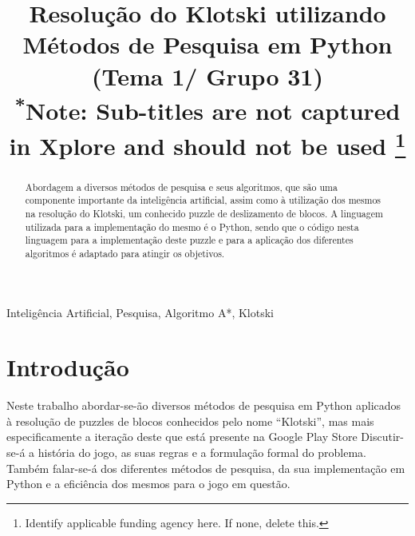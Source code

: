\documentclass[conference]{IEEEtran}
\begin{document}
\title{Resolução do Klotski utilizando Métodos de Pesquisa em Python (Tema 1/ Grupo 31)\\
{\footnotesize \textsuperscript{*}Note: Sub-titles are not captured in Xplore and
should not be used}
\thanks{Identify applicable funding agency here. If none, delete this.}
}

\author{
\and
{}
\and
{}
}

\maketitle

\begin{abstract}
Abordagem a diversos métodos de pesquisa e seus algoritmos, que são uma componente importante da inteligência artificial, assim como à utilização dos mesmos na resolução do Klotski, um conhecido puzzle de deslizamento de blocos.
A linguagem utilizada para a implementação do mesmo é o Python, sendo que o código nesta linguagem para a implementação deste puzzle e para a aplicação dos diferentes algoritmos é adaptado para atingir os objetivos.
\end{abstract}

\begin{IEEEkeywords}
Inteligência Artificial, Pesquisa, Algoritmo A*, Klotski
\end{IEEEkeywords}

\section{Introdução}
Neste trabalho abordar-se-ão diversos métodos de pesquisa em Python aplicados à resolução de puzzles de blocos conhecidos pelo nome “Klotski”, mas mais especificamente a iteração deste que está presente na Google Play Store \cite{b1} Discutir-se-á a história do jogo, as suas regras e a formulação formal do problema. Também falar-se-á dos diferentes métodos de pesquisa, da sua implementação em Python e a eficiência dos mesmos para o jogo em questão. 
\end{document}
